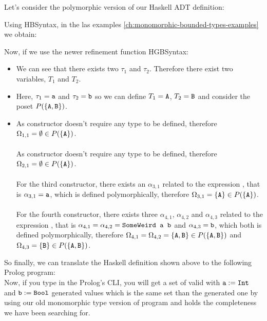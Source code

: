 	\begin{example}[SomeWeird]
		Let's consider the polymorphic version of our  Haskell ADT definition:
		
		Using HBSyntax, in the las examples \ref{ch:monomorphic-bounded-types-examples} we obtain:
		
		Now, if we use the newer refinement function HGBSyntax:
		\begin{itemize}
			\item We can see that there exists two $\tau_1$ and $\tau_2$. Therefore there exist two variables, $T_1$ and $T_2$.
			\item Here, $\tau_1 = \texttt{a}$ and $\tau_2 = \texttt{b}$ so we can define $T_1 = \texttt{A}$, $T_2 = \texttt{B}$ and consider the poset $P(\{\texttt{A}, \texttt{B}\})$.
			\item As  constructor doesn't require any type to be defined, therefore $\Omega_{1,1} = \emptyset \in P(\{ \texttt{A} \})$. \\\\
			      As  constructor doesn't require any type to be defined, therefore $\Omega_{2,1} = \emptyset \in P(\{ \texttt{A} \})$. \\\\
			      For the third constructor, there exists an $\alpha_{3,1}$ related to the expression , that is $\alpha_{3,1} = \texttt{a}$, which is defined polymorphically, therefore $\Omega_{3,1} = \{\texttt{A}\} \in P(\{ \texttt{A} \})$. \\\\
			      For the fourth constructor, there exists three $\alpha_{4,1}$, $\alpha_{4,2}$ and $\alpha_{4,3}$ related to the expression , that is $\alpha_{4,1} = \alpha_{4,2} = \texttt{SomeWeird a b}$ and $\alpha_{4,3} = \texttt{b}$, which both is defined polymorphically, therefore $\Omega_{4,1} = \Omega_{4,2} = \{\texttt{A}, \texttt{B}\} \in P(\{ \texttt{A} , \texttt{B} \})$ and $\Omega_{4,3} = \{\texttt{B}\} \in P(\{ \texttt{A} , \texttt{B} \})$.
		\end{itemize}
		So finally, we can translate the Haskell definition shown above to the following Prolog program:\\
		
		Now, if you type  in the Prolog's CLI, you will get a set of valid  with $\texttt{a} := \texttt{Int}$ and $\texttt{b} := \texttt{Bool}$ generated values which is the same set than the generated one by using our old monomorphic type version of  program and holds the completeness we have been searching for.\\
	\end{example}
